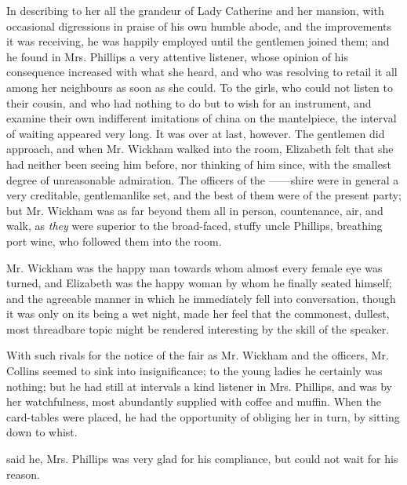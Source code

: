 In describing to her all the grandeur of Lady Catherine and her mansion, with occasional digressions in praise of his own humble abode, and the improvements it was receiving, he was happily employed until the gentlemen joined them; and he found in Mrs. Phillips a very attentive listener, whose opinion of his consequence increased with what she heard, and who was resolving to retail it all among her neighbours as soon as she could. To the girls, who could not listen to their cousin, and who had nothing to do but to wish for an instrument, and examine their own indifferent imitations of china on the mantelpiece, the interval of waiting appeared very long. It was over at last, however. The gentlemen did approach, and when Mr. Wickham walked into the room, Elizabeth felt that she had neither been seeing him before, nor thinking of him since, with the smallest degree of unreasonable admiration. The officers of the ------shire were in general a very creditable, gentlemanlike set, and the best of them were of the present party; but Mr. Wickham was as far beyond them all in person, countenance, air, and walk, as {\em they} were superior to the broad-faced, stuffy uncle Phillips, breathing port wine, who followed them into the room.

Mr. Wickham was the happy man towards whom almost every female eye was turned, and Elizabeth was the happy woman by whom he finally seated himself; and the agreeable manner in which he immediately fell into conversation, though it was only on its being a wet night, made her feel that the commonest, dullest, most threadbare topic might be rendered interesting by the skill of the speaker.

With such rivals for the notice of the fair as Mr. Wickham and the officers, Mr. Collins seemed to sink into insignificance; to the young ladies he certainly was nothing; but he had still at intervals a kind listener in Mrs. Phillips, and was by her watchfulness, most abundantly supplied with coffee and muffin. When the card-tables were placed, he had the opportunity of obliging her in turn, by sitting down to whist.

 said he,  Mrs. Phillips was very glad for his compliance, but could not wait for his reason.


